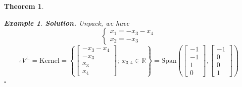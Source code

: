 \documentclass[12pt, a4paper]{article}
\newtheorem{thm}{Theorem}[subsection]
\newtheorem{eg}{Example}[subsection]
\newenvironment*{sol}{\indent\textbf{Solution. }}{\hfill{$\square$}\par}
\def\R{{\mathbb{R}}}
\def\Span{\mathrm{Span}}
\begin{document}
\begin{thm}
\begin{eg}
\begin{sol}
		Unpack, we have \[\begin{cases}x_1=-x_3-x_4\\x_2=-x_3\end{cases}\]
		\[\therefore V^\perp=\text{Kernel}=\left\{\begin{bmatrix}-x_3-x_4\\-x_3\\x_3\\x_4\end{bmatrix};\ x_{3,4}\in\R\right\}=\Span\left(\begin{bmatrix}-1\\-1\\1\\0\end{bmatrix},\begin{bmatrix}-1\\0\\0\\1\end{bmatrix}\right)\]
	\end{sol}
	\end{eg}
\end{thm}
\end{document}
